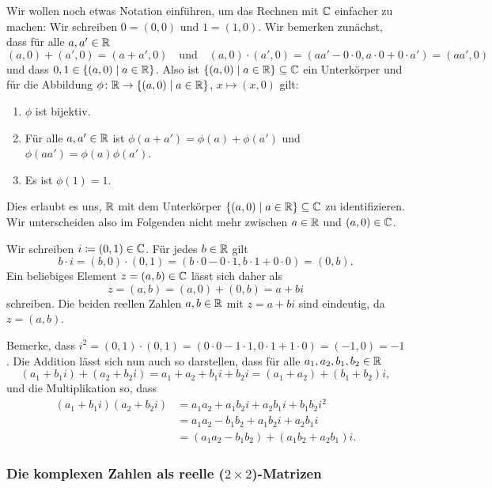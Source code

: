Wir wollen noch etwas Notation einführen, um das Rechnen mit $\mathbb{C}$ einfacher zu machen: Wir schreiben $0 = (0,0)$ und $1 = (1,0)$. Wir bemerken zunächst, dass für alle $a, a' \in \mathbb{R}$
\[
 (a,0) + (a',0) = (a + a', 0)
 \quad\text{und}\quad
 (a,0) \cdot (a',0) = (a a' - 0 \cdot 0, a \cdot 0 + 0 \cdot a') = (a a', 0)
\]
und dass $0, 1 \in \{(a,0) \mid a \in \mathbb{R}\}$. Also ist $\{(a,0) \mid a \in \mathbb{R}\} \subseteq \mathbb{C}$ ein Unterkörper und für die Abbildung $\phi \colon \mathbb{R} \to \{(a,0) \mid a \in \mathbb{R}\}$, $x \mapsto (x,0)$ gilt:
\begin{enumerate}[label=\roman*)]
 \item
  $\phi$ ist bijektiv.
 \item
  Für alle $a,a' \in \mathbb{R}$ ist $\phi(a+a') = \phi(a)+\phi(a')$ und $\phi(aa') = \phi(a)\phi(a')$.
 \item
  Es ist $\phi(1) = 1$.
\end{enumerate}
Dies erlaubt es uns, $\mathbb{R}$ mit dem Unterkörper $\{(a,0) \mid a \in \mathbb{R}\} \subseteq \mathbb{C}$ zu identifizieren. Wir unterscheiden also im Folgenden nicht mehr zwischen $a \in \mathbb{R}$ und $(a,0) \in \mathbb{C}$.

Wir schreiben $i \coloneqq (0,1) \in \mathbb{C}$. Für jedes $b \in \mathbb{R}$ gilt
\[
 b \cdot i = (b,0) \cdot (0,1) = (b \cdot 0 - 0 \cdot 1, b \cdot 1 + 0 \cdot 0) = (0,b).
\]
Ein beliebiges Element $z = (a,b) \in \mathbb{C}$ lässt sich daher als
\[
 z = (a,b) = (a,0) + (0,b) = a + bi
\]
schreiben. Die beiden reellen Zahlen $a,b \in \mathbb{R}$ mit $z = a + bi$ sind eindeutig, da $z = (a,b)$.

Bemerke, dass $i^2 = (0,1) \cdot (0,1) = (0 \cdot 0 - 1 \cdot 1, 0 \cdot 1 + 1 \cdot 0) = (-1, 0) = -1$. Die Addition lässt sich nun auch so darstellen, dass für alle $a_1, a_2, b_1, b_2 \in \mathbb{R}$
\[
 (a_1 + b_1 i) + (a_2 + b_2 i)
 = a_1 + a_2 + b_1 i + b_2 i
 = (a_1 + a_2) + (b_1 + b_2) i,
\]
und die Multiplikation so, dass
\begin{align*}
 (a_1 + b_1 i)(a_2 + b_2 i)
 &= a_1 a_2 + a_1 b_2 i + a_2 b_1 i + b_1 b_2 i^2 \\
 &= a_1 a_2 - b_1 b_2 + a_1 b_2 i + a_2 b_1 i \\
 &= (a_1 a_2 - b_1 b_2) + (a_1 b_2 + a_2 b_1) i.
\end{align*}


\subsubsection{Die komplexen Zahlen als reelle (\texorpdfstring{$2 \times 2$}{2x2})-Matrizen}







